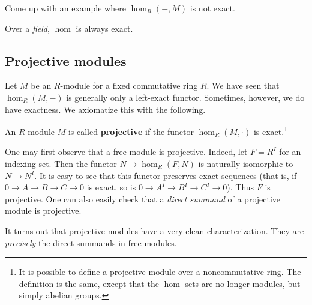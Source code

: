 \begin{exercise}
Come up with an example where $\hom_R(-, M)$ is not exact.
\end{exercise}

\begin{exercise}
Over a \emph{field}, $\hom$ is always exact.
\end{exercise}

\subsection{Projective modules}

Let $M$ be an $R$-module for a fixed commutative ring $R$. We have seen that
$\hom_R(M,-)$ is generally only a left-exact functor.
Sometimes, however, we do have exactness. We axiomatize this with the
following.

\begin{definition} \label{projectives}
An $R$-module $M$ is called \textbf{projective} if the functor $\hom_R(M,
\cdot)$ is
exact.\footnote{It is possible to define a projective module over a
noncommutative ring. The definition is the same, except that the $\hom$-sets
are no longer modules, but simply abelian groups. }
\end{definition}

One may first observe that a free module is projective.
Indeed, let $F = R^I$ for an indexing set. Then the functor $N \to \hom_R(F,
N)$ is
naturally
isomorphic to $N \to N^I$. It is easy to see that this functor preserves
exact sequences (that is, if $0 \to A \to B \to C \to 0$ is exact, so is $0
\to A^I \to B^I \to C^I \to 0$).
Thus $F$ is projective.
One can also easily check that a \emph{direct summand} of a projective module
is projective.

It turns out that projective modules have a very clean characterization. They
are  \emph{precisely} the direct
summands in free modules.

